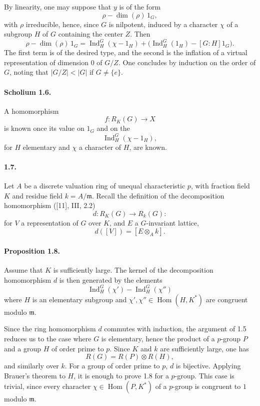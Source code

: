 \documentclass[10pt]{article}
\newcommand{\Hom}{\operatorname{Hom}}
\newcommand{\Ind}{\operatorname{Ind}}
\providecommand{\Hom}{\operatorname{Hom}}
\providecommand{\Hom}{\operatorname{Hom}}
\providecommand{\Hom}{\operatorname{Hom}}
\providecommand{\Ind}{\operatorname{Ind}}
\begin{document}
By linearity, one may suppose that \(y\) is of the form
\[
\rho-\dim(\rho)\,1_G,
\]
with \(\rho\) irreducible, hence, since \(G\) is nilpotent, induced by a character \(\chi\) of a subgroup \(H\) of \(G\) containing the center \(Z\). Then
\[
\rho-\dim(\rho)\,1_G
=
\Ind_H^G(\chi-1_H)+\bigl(\Ind_H^G(1_H)-[G:H]1_G\bigr).
\]
The first term is of the desired type, and the second is the inflation of a virtual representation of dimension \(0\) of \(G/Z\). One concludes by induction on the order of \(G\), noting that \(|G/Z|<|G|\) if \(G\ne\{e\}\).

\paragraph{Scholium 1.6.} A homomorphism
\[
f:R_K(G)\longrightarrow X
\]
is known once its value on \(1_G\) and on the
\[
\Ind_H^G(\chi-1_H),
\]
for \(H\) elementary and \(\chi\) a character of \(H\), are known.

\paragraph{1.7.} Let \(A\) be a discrete valuation ring of unequal characteristic \(p\), with fraction field \(K\) and residue field \(k=A/\mathfrak m\). Recall the definition of the decomposition homomorphism ([11], III, 2.2)
\[
d:R_K(G)\longrightarrow R_k(G):
\]
for \(V\) a representation of \(G\) over \(K\), and \(E\) a \(G\)-invariant lattice,
\[
d([V])=[E\otimes_Ak].
\]




\paragraph{Proposition 1.8.} Assume that \(K\) is sufficiently large. The kernel of the decomposition homomorphism \(d\) is then generated by the elements
\[
\Ind_H^G(\chi')-\Ind_H^G(\chi'')
\]
where \(H\) is an elementary subgroup and \(\chi',\chi''\in\Hom(H,K^*)\) are congruent modulo \(\mathfrak m\).

Since the ring homomorphism \(d\) commutes with induction, the argument of 1.5 reduces us to the case where \(G\) is elementary, hence the product of a \(p\)-group \(P\) and a group \(H\) of order prime to \(p\). Since \(K\) and \(k\) are sufficiently large, one has
\[
R(G)=R(P)\otimes R(H),
\]
and similarly over \(k\). For a group of order prime to \(p\), \(d\) is bijective. Applying Brauer's theorem to \(H\), it is enough to prove 1.8 for a \(p\)-group. This case is trivial, since every character \(\chi\in\Hom(P,K^*)\) of a \(p\)-group is congruent to \(1\) modulo \(\mathfrak m\).
\end{document}
